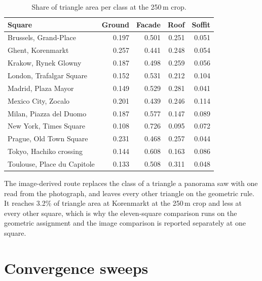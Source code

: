 \documentclass[journal]{IEEEtran}
\begin{document}
\begin{table}[t]
  \centering
  \caption{Share of triangle area per class at the 250\,m crop.}
  \label{tab:si-areas}
  \footnotesize
  \begin{tabular}{lrrrr}
    \toprule
    Square & Ground & Facade & Roof & Soffit \\
    \midrule
    Brussels, Grand-Place       & 0.197 & 0.501 & 0.251 & 0.051 \\
    Ghent, Korenmarkt           & 0.257 & 0.441 & 0.248 & 0.054 \\
    Krakow, Rynek Glowny        & 0.187 & 0.498 & 0.259 & 0.056 \\
    London, Trafalgar Square    & 0.152 & 0.531 & 0.212 & 0.104 \\
    Madrid, Plaza Mayor         & 0.149 & 0.529 & 0.281 & 0.041 \\
    Mexico City, Zocalo         & 0.201 & 0.439 & 0.246 & 0.114 \\
    Milan, Piazza del Duomo     & 0.187 & 0.577 & 0.147 & 0.089 \\
    New York, Times Square      & 0.108 & 0.726 & 0.095 & 0.072 \\
    Prague, Old Town Square     & 0.231 & 0.468 & 0.257 & 0.044 \\
    Tokyo, Hachiko crossing     & 0.144 & 0.608 & 0.163 & 0.086 \\
    Toulouse, Place du Capitole & 0.133 & 0.508 & 0.311 & 0.048 \\
    \bottomrule
  \end{tabular}
\end{table}

The image-derived route replaces the class of a triangle a panorama saw with one
read from the photograph, and leaves every other triangle on the geometric rule.
It reaches 3.2\% of triangle area at Korenmarkt at the 250\,m crop and less at
every other square, which is why the eleven-square comparison runs on the
geometric assignment and the image comparison is reported separately at one
square.

\section{Convergence sweeps}
\label{sec:si-convergence}
\end{document}

